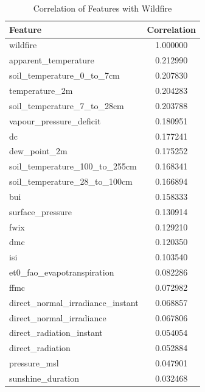 \begin{table}[H]
	\caption{Correlation of Features with Wildfire}
	\centering
	\label{wildfire_correlation}
	\begin{tabular}{lc}
		\hline
		Feature                                   & Correlation \\ \hline
		wildfire                                  & 1.000000    \\ 
		apparent\_temperature                & 0.212990    \\ 
		soil\_temperature\_0\_to\_7cm           & 0.207830    \\ 
		temperature\_2m                      & 0.204283    \\ 
		soil\_temperature\_7\_to\_28cm          & 0.203788    \\ 
		vapour\_pressure\_deficit             & 0.180951    \\ 
		dc                                         & 0.177241    \\ 
		dew\_point\_2m                        & 0.175252    \\ 
		soil\_temperature\_100\_to\_255cm       & 0.168341    \\ 
		soil\_temperature\_28\_to\_100cm        & 0.166894    \\ 
		bui                                        & 0.158333    \\ 
		surface\_pressure                    & 0.130914    \\ 
		fwix                                       & 0.129210    \\ 
		dmc                                        & 0.120350    \\ 
		isi                                        & 0.103540    \\ 
		et0\_fao\_evapotranspiration          & 0.082286    \\ 
		ffmc                                       & 0.072982    \\ 
		direct\_normal\_irradiance\_instant    & 0.068857    \\ 
		direct\_normal\_irradiance            & 0.067806    \\ 
		direct\_radiation\_instant            & 0.054054    \\ 
		direct\_radiation                    & 0.052884    \\ 
		pressure\_msl                        & 0.047901    \\ 
		sunshine\_duration                   & 0.032468    \\ 

\end{tabular}
\end{table}
